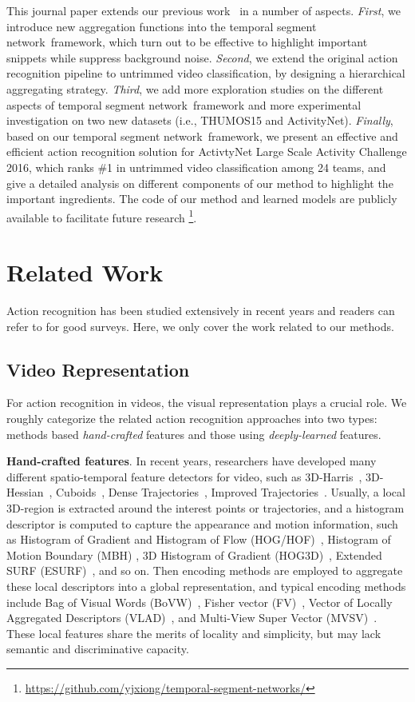 \documentclass[10pt,journal,compsoc]{IEEEtran}
\newcommand{\SEGNET}{temporal segment network}
\begin{document}
This journal paper extends our previous work~\cite{WangXWQLTV16} in a number of aspects. {\em First}, we introduce new aggregation functions into the \SEGNET~framework, which turn out to be effective to highlight important snippets while suppress background noise. {\em Second}, we extend the original action recognition pipeline to untrimmed video classification, by designing a hierarchical aggregating strategy. {\em Third}, we add more exploration studies on the different aspects of  \SEGNET~framework and more experimental investigation on two new datasets (i.e., THUMOS15 and ActivityNet). {\em Finally}, based on our \SEGNET~framework, we present an  effective and efficient action recognition solution for ActivtyNet Large Scale Activity Challenge 2016, which ranks \#1 in untrimmed video classification among 24 teams, and give a detailed analysis on different components of our method to highlight the important ingredients. The code of our method and learned models are publicly available to facilitate future research \footnote{\url{https://github.com/yjxiong/temporal-segment-networks/}}.


\section{Related Work}
\label{sec:rw}
Action recognition has been studied extensively in recent years and readers can refer to \cite{ForsythAIOR05,TuragaCSU08,AggarwalR11} for good surveys. Here, we only cover the work related to our methods.

\subsection{Video Representation}

 For action recognition in videos, the visual representation plays a crucial role. We roughly categorize the related action recognition approaches into two types: methods based {\em hand-crafted} features and those using {\em deeply-learned} features.

{\bf Hand-crafted features}. In recent years, researchers have developed many different spatio-temporal feature detectors for video, such as 3D-Harris~\cite{Laptev05}, 3D-Hessian~\cite{WillemsTG08}, Cuboids~\cite{Dollar05}, Dense Trajectories~\cite{WangKSL11}, Improved Trajectories~\cite{WangS13a}. Usually, a local 3D-region is extracted around the interest points or trajectories, and a histogram descriptor is computed to capture the appearance and motion information, such as Histogram of Gradient and Histogram of Flow (HOG/HOF)~\cite{LaptevMSR08}, Histogram of Motion Boundary (MBH) \cite{WangKSL11}, 3D Histogram of Gradient (HOG3D)~\cite{KlaserMS08}, Extended SURF (ESURF)~\cite{WillemsTG08}, and so on. Then encoding methods are employed to aggregate these local descriptors into a global representation, and typical encoding methods include Bag of Visual Words (BoVW)~\cite{csurka2004}, Fisher vector (FV)~\cite{SanchezPMV13}, Vector of Locally Aggregated Descriptors (VLAD)~\cite{JegouPDSPS12}, and Multi-View Super Vector (MVSV)~\cite{CaiWPQ14}. These local features share the merits of locality and simplicity, but may lack semantic and discriminative capacity.
\end{document}
